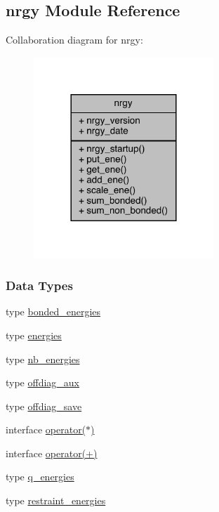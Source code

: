 \hypertarget{classnrgy}{\subsection{nrgy Module Reference}
\label{classnrgy}
}


Collaboration diagram for nrgy\-:
\nopagebreak
\begin{figure}[H]
\begin{center}
\leavevmode
\includegraphics[width=192pt]{classnrgy__coll__graph}
\end{center}
\end{figure}
\subsubsection*{Data Types}
\begin{DoxyCompactItemize}
\item 
type \hyperlink{structnrgy_1_1bonded__energies}{bonded\-\_\-energies}
\item 
type \hyperlink{structnrgy_1_1energies}{energies}
\item 
type \hyperlink{structnrgy_1_1nb__energies}{nb\-\_\-energies}
\item 
type \hyperlink{structnrgy_1_1offdiag__aux}{offdiag\-\_\-aux}
\item 
type \hyperlink{structnrgy_1_1offdiag__save}{offdiag\-\_\-save}
\item 
interface \hyperlink{interfacenrgy_1_1operator_07_5_08}{operator($\ast$)}
\item 
interface \hyperlink{interfacenrgy_1_1operator_07_09_08}{operator(+)}
\item 
type \hyperlink{structnrgy_1_1q__energies}{q\-\_\-energies}
\item 
type \hyperlink{structnrgy_1_1restraint__energies}{restraint\-\_\-energies}
\end{DoxyCompactItemize}
